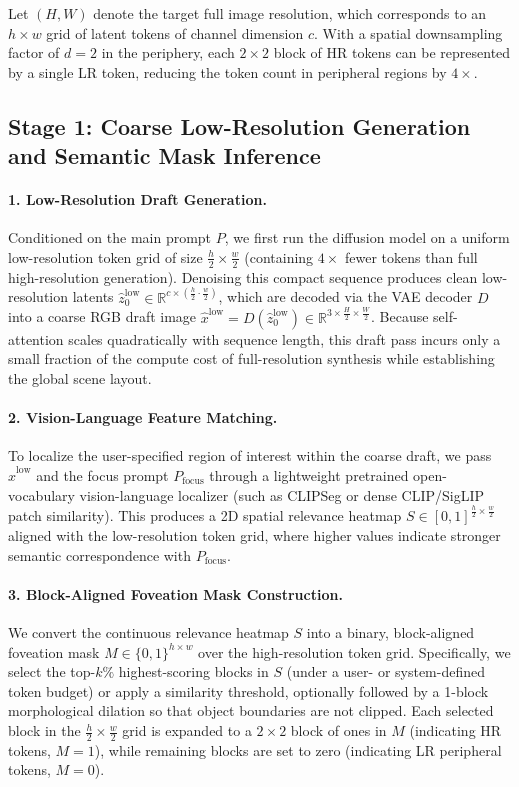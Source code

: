 \documentclass[11pt]{article}
\begin{document}
Let $(H, W)$ denote the target full image resolution, which corresponds to an $h \times w$ grid of latent tokens of channel dimension $c$. With a spatial downsampling factor of $d = 2$ in the periphery, each $2 \times 2$ block of HR tokens can be represented by a single LR token, reducing the token count in peripheral regions by $4\times$.

\subsection{Stage 1: Coarse Low-Resolution Generation and Semantic Mask Inference}

\paragraph{1. Low-Resolution Draft Generation.}
Conditioned on the main prompt $P$, we first run the diffusion model on a uniform low-resolution token grid of size $\frac{h}{2} \times \frac{w}{2}$ (containing $4\times$ fewer tokens than full high-resolution generation). Denoising this compact sequence produces clean low-resolution latents $\hat{z}_0^{\text{low}} \in \mathbb{R}^{c \times (\frac{h}{2} \cdot \frac{w}{2})}$, which are decoded via the VAE decoder $D$ into a coarse RGB draft image $\hat{x}^{\text{low}} = D(\hat{z}_0^{\text{low}}) \in \mathbb{R}^{3 \times \frac{H}{2} \times \frac{W}{2}}$. Because self-attention scales quadratically with sequence length, this draft pass incurs only a small fraction of the compute cost of full-resolution synthesis while establishing the global scene layout.

\paragraph{2. Vision-Language Feature Matching.}
To localize the user-specified region of interest within the coarse draft, we pass $\hat{x}^{\text{low}}$ and the focus prompt $P_{\text{focus}}$ through a lightweight pretrained open-vocabulary vision-language localizer (such as CLIPSeg or dense CLIP/SigLIP patch similarity). This produces a 2D spatial relevance heatmap $S \in [0, 1]^{\frac{h}{2} \times \frac{w}{2}}$ aligned with the low-resolution token grid, where higher values indicate stronger semantic correspondence with $P_{\text{focus}}$.

\paragraph{3. Block-Aligned Foveation Mask Construction.}
We convert the continuous relevance heatmap $S$ into a binary, block-aligned foveation mask $M \in \{0, 1\}^{h \times w}$ over the high-resolution token grid. Specifically, we select the top-$k\%$ highest-scoring blocks in $S$ (under a user- or system-defined token budget) or apply a similarity threshold, optionally followed by a 1-block morphological dilation so that object boundaries are not clipped. Each selected block in the $\frac{h}{2} \times \frac{w}{2}$ grid is expanded to a $2 \times 2$ block of ones in $M$ (indicating HR tokens, $M=1$), while remaining blocks are set to zero (indicating LR peripheral tokens, $M=0$).
\end{document}
